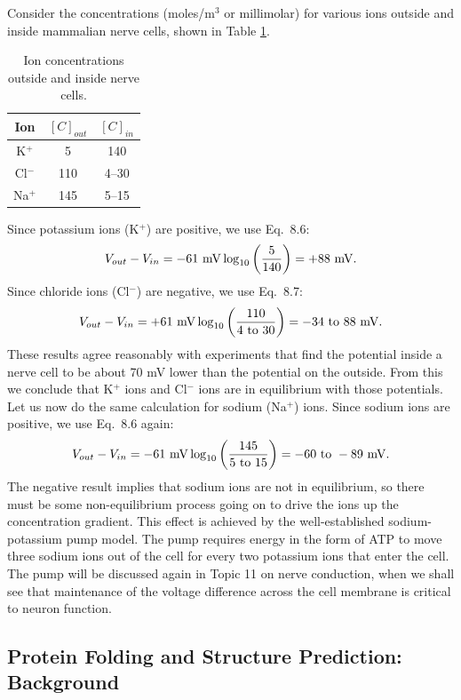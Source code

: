 Consider the concentrations (moles/m$^3$ or millimolar) for various ions outside and inside mammalian nerve cells, shown in Table \ref{table8-3}.
\begin{table}[htb]
\begin{center}
\begin{tabular}{|c|c|c|}
\hline
Ion & $[C]_{out}$ & $[C]_{in}$\\
\hline
K$^+$  &	5   & 140\\
Cl$^-$ &	110 & 4--30\\
Na$^+$ &	145 & 5--15\\
\hline
\end{tabular}
\caption{Ion concentrations outside and inside nerve cells.}
\label{table8-3}
\end{center}
\end{table}
Since potassium ions (K$^+$) are positive, we use Eq.~8.6:
$$V_{out}-V_{in}  =  -61~{\rm mV}\log_{10}\left(\frac{5}{140}\right)= +88~{\rm mV}.$$
Since chloride ions (Cl$^-$) are negative, we use Eq.~8.7:
$$V_{out}-V_{in}  =  +61~{\rm mV}\log_{10}\left(\frac{110}{4~{\rm to}~30}\right)= -34~{\rm to}~88~{\rm mV}.$$
These results agree reasonably with experiments that find the potential inside a nerve cell to be about 70 mV lower than the potential on the outside.  From this we conclude that K$^+$ ions and Cl$^-$ ions are in equilibrium with those potentials.  Let us now do the same calculation for sodium (Na$^+$) ions.  Since sodium ions are positive, we use Eq.~8.6 again:  
$$V_{out}-V_{in}  =  -61~{\rm mV}\log_{10}\left(\frac{145}{5~{\rm to}~15}\right)= -60~{\rm to}~-89~{\rm mV}.$$
The negative result implies that sodium ions are not in equilibrium, so there must be some non-equilibrium process going on to drive the ions up the concentration gradient.  This effect is achieved by the well-established sodium-potassium pump model.  The pump requires energy in the form of ATP to move three sodium ions out of the cell for every two potassium ions that enter the cell.  The pump will be discussed again in Topic 11 on nerve conduction, when we shall see that maintenance of the voltage difference across the cell membrane is critical to neuron function.

\subsection{Protein Folding and Structure Prediction: Background}

